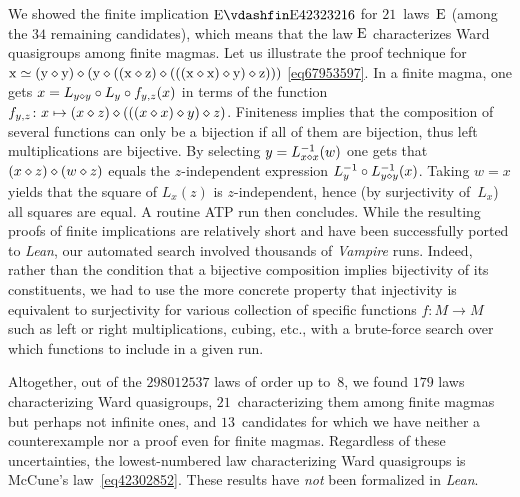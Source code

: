 We showed the finite implication $\E\vdashfin\Eq{42323216}$ for $21$~laws~$\mathrm{E}$ (among the $34$ remaining candidates), which means that the law $\mathrm{E}$ characterizes Ward quasigroups among finite magmas.  Let us illustrate the proof technique for $\mathrm{x} \simeq (\mathrm{y} \diamond \mathrm{y}) \diamond (\mathrm{y} \diamond ((\mathrm{x} \diamond \mathrm{z}) \diamond (((\mathrm{x} \diamond \mathrm{x}) \diamond \mathrm{y}) \diamond \mathrm{z})))$ \eqref{eq67953597}.  In a finite magma, one gets $x = L_{y\diamond y} \circ L_y \circ f_{y,z}(x)$ in terms of the function $f_{y,z}\colon x \mapsto (x\diamond z) \diamond (((x \diamond x) \diamond y) \diamond z)$.  Finiteness implies that the composition of several functions can only be a bijection if all of them are bijection, thus left multiplications are bijective.  By selecting $y=L_{x\diamond x}^{-1}(w)$ one gets that $(x\diamond z)\diamond (w\diamond z)$ equals the $z$-independent expression $L_y^{-1} \circ L_{y\diamond y}^{-1}(x)$.  Taking $w=x$ yields that the square of $L_x(z)$ is $z$-independent, hence (by surjectivity of~$L_x$) all squares are equal.  A routine ATP run then concludes.
While the resulting proofs of finite implications are relatively short and have been successfully ported to \emph{Lean}, our automated search involved thousands of \emph{Vampire} runs.
Indeed, rather than the condition that a bijective composition implies bijectivity of its constituents, we had to use the more concrete property that injectivity is equivalent to surjectivity for various collection of specific functions $f\colon M\to M$ such as left or right multiplications, cubing, etc.\@, with a brute-force search over which functions to include in a given run.

Altogether, out of the $\num{298012537}$ laws of order up to~$8$, we found $179$ laws characterizing Ward quasigroups, $21$~characterizing them among finite magmas but perhaps not infinite ones, and $13$~candidates for which we have neither a counterexample nor a proof even for finite magmas.  Regardless of these uncertainties, the lowest-numbered law characterizing Ward quasigroups is McCune's law~\eqref{eq42302852}.  These results have \emph{not} been formalized in \emph{Lean}.

